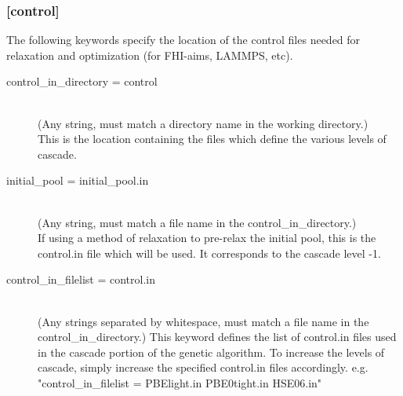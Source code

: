 \subsubsection{[control]}
		The following keywords specify the location of the control files needed for relaxation and optimization (for FHI-aims, LAMMPS, etc).
\begin{description}
	\item[control\_in\_directory = control]~\\
			(Any string, must match a directory name in the working directory.)\\
			This is the location containing the files which define the various levels of cascade.
	\item[initial\_pool = initial\_pool.in]~\\
			(Any string, must match a file name in the control\_in\_directory.)\\
			If using a method of relaxation to pre-relax the initial pool, this is the control.in file which will be used. It corresponds to the cascade level -1.
	\item[control\_in\_filelist = control.in ]~\\
			(Any strings separated by whitespace, must match a file name in the control\_in\_directory.)
			This keyword defines the list of control.in files used in the cascade portion of the genetic algorithm. To increase the levels of cascade, simply increase the specified control.in files accordingly. e.g. "control\_in\_filelist = PBElight.in PBE0tight.in HSE06.in"
\end{description}


